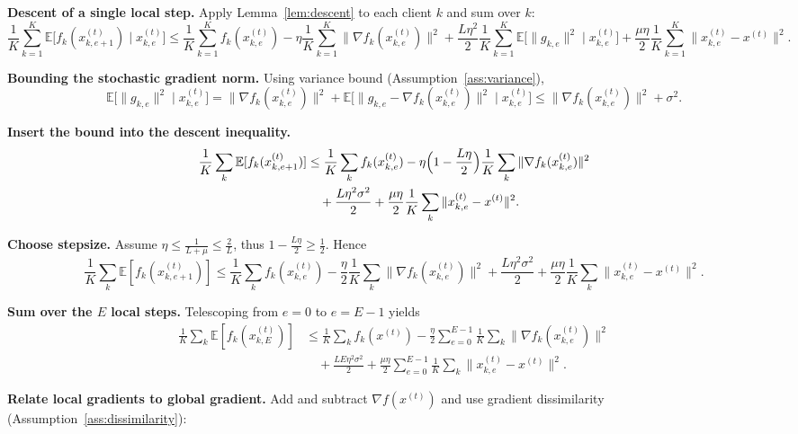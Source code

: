 \documentclass[11pt]{article}
\newcommand{\E}{\mathbb{E}}
\newcommand{\step}[1]{\textbf{[Step #1]}}
\begin{document}
\begin{enumerate}[label=\step{\arabic*}, leftmargin=*]
\item \textbf{Descent of a single local step.}  
Apply Lemma~\ref{lem:descent} to each client $k$ and sum over $k$:
\[
\frac1K\sum_{k=1}^{K}\E\!\bigl[f_k(x^{(t)}_{k,e+1})\mid x^{(t)}_{k,e}\bigr]
\le
\frac1K\sum_{k=1}^{K}f_k(x^{(t)}_{k,e})
-\eta\frac1K\sum_{k=1}^{K}\|\nabla f_k(x^{(t)}_{k,e})\|^{2}
+\frac{L\eta^{2}}{2}\frac1K\sum_{k=1}^{K}\E\!\bigl[\|g_{k,e}\|^{2}\mid x^{(t)}_{k,e}\bigr]
+\frac{\mu\eta}{2}\frac1K\sum_{k=1}^{K}\|x^{(t)}_{k,e}-x^{(t)}\|^{2}.
\] 
\item \textbf{Bounding the stochastic gradient norm.}  
Using variance bound (Assumption~\ref{ass:variance}),
\[
\E\!\bigl[\|g_{k,e}\|^{2}\mid x^{(t)}_{k,e}\bigr]
= \|\nabla f_k(x^{(t)}_{k,e})\|^{2}+\E\!\bigl[\|g_{k,e}-\nabla f_k(x^{(t)}_{k,e})\|^{2}\mid x^{(t)}_{k,e}\bigr]
\le \|\nabla f_k(x^{(t)}_{k,e})\|^{2}+\sigma^{2}.
\] 
\item \textbf{Insert the bound into the descent inequality.}
\[
\begin{aligned}
\frac1K\sum_{k} \E[f_k(x^{(t)}_{k,e+1})]
&\le \frac1K\sum_{k} f_k(x^{(t)}_{k,e})
-\eta\Bigl(1-\frac{L\eta}{2}\Bigr)\frac1K\sum_{k}\|\nabla f_k(x^{(t)}_{k,e})\|^{2}\\
&\quad+\frac{L\eta^{2}\sigma^{2}}{2}
+\frac{\mu\eta}{2}\frac1K\sum_{k}\|x^{(t)}_{k,e}-x^{(t)}\|^{2}.
\end{aligned}
\] 
\item \textbf{Choose stepsize.}  
Assume $\eta\le\frac{1}{L+\mu}\le\frac{2}{L}$, thus $1-\frac{L\eta}{2}\ge\frac12$. Hence
\[
\frac1K\sum_{k} \E[f_k(x^{(t)}_{k,e+1})]
\le \frac1K\sum_{k} f_k(x^{(t)}_{k,e})
-\frac{\eta}{2}\frac1K\sum_{k}\|\nabla f_k(x^{(t)}_{k,e})\|^{2}
+\frac{L\eta^{2}\sigma^{2}}{2}
+\frac{\mu\eta}{2}\frac1K\sum_{k}\|x^{(t)}_{k,e}-x^{(t)}\|^{2}.
\] 
\item \textbf{Sum over the $E$ local steps.}  
Telescoping from $e=0$ to $e=E-1$ yields
\[
\begin{aligned}
\frac1K\sum_{k} \E[f_k(x^{(t)}_{k,E})]
&\le \frac1K\sum_{k} f_k(x^{(t)}) 
-\frac{\eta}{2}\sum_{e=0}^{E-1}\frac1K\sum_{k}\|\nabla f_k(x^{(t)}_{k,e})\|^{2}\\
&\quad+ \frac{LE\eta^{2}\sigma^{2}}{2}
+\frac{\mu\eta}{2}\sum_{e=0}^{E-1}\frac1K\sum_{k}\|x^{(t)}_{k,e}-x^{(t)}\|^{2}.
\end{aligned}
\] 
\item \textbf{Relate local gradients to global gradient.}  
Add and subtract $\nabla f(x^{(t)})$ and use gradient dissimilarity (Assumption~\ref{ass:dissimilarity}):

\end{enumerate}
\end{document}

